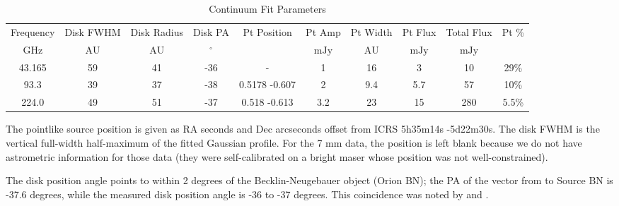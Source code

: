 \documentclass[twocolumn]{aastex61}
\begin{document}
\begin{table}[htp]
\centering
\caption{Continuum Fit Parameters}
\begin{tabular}{cccccccccc}
\label{tab:continuum_fit_parameters}
Frequency & Disk FWHM & Disk Radius & Disk PA & Pt Position & Pt Amp & Pt Width & Pt Flux & Total Flux & Pt \% \\
$\mathrm{GHz}$ & $\mathrm{AU}$ & $\mathrm{AU}$ & $\mathrm{{}^{\circ}}$ &  & $\mathrm{mJy}$ & $\mathrm{AU}$ & $\mathrm{mJy}$ & $\mathrm{mJy}$ & $\mathrm{}$ \\
\hline
43.165 & 59 & 41 & -36 & - & 1 & 16 & 3 & 10 & 29\% \\
93.3 & 39 & 37 & -38 & 0.5178 -0.607 & 2 & 9.4 & 5.7 & 57 & 10\% \\
224.0 & 49 & 51 & -37 & 0.518 -0.613 & 3.2 & 23 & 15 & 280 & 5.5\% \\
\hline
\end{tabular}

\par The pointlike source position is given as RA seconds and Dec arcseconds offset from ICRS 5h35m14s -5d22m30s.   The disk FWHM is the vertical full-width half-maximum of the fitted Gaussian profile.  For the 7 mm data, the position is left blank because we do not have astrometric information for those data (they were self-calibrated on a bright maser whose position was not well-constrained).
\end{table}
 
The disk position angle points to within 2 degrees of the Becklin-Neugebauer
object (Orion BN); the PA of the vector from \sourcei to Source BN is -37.6
degrees, while the measured disk position angle is -36 to -37 degrees.
This coincidence was noted by \citet{Bally2011a} and \citet{Goddi2011b}.

\end{document}
